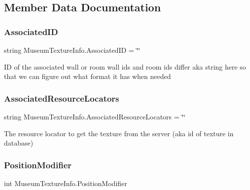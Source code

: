 \subsection{Member Data Documentation}
\mbox{\label{class_museum_texture_info_a31425831c498a46842b2cce06e629183}} 
\subsubsection{\texorpdfstring{Associated\+ID}{AssociatedID}}
{\footnotesize\ttfamily string Museum\+Texture\+Info.\+Associated\+ID = \char`\"{}\char`\"{}}



ID of the associated wall or room wall ids and room ids differ aka string here so that we can figure out what format it has when needed 

\mbox{\label{class_museum_texture_info_ae24092193557d3775c07762acb158adc}} 
\subsubsection{\texorpdfstring{Associated\+Resource\+Locators}{AssociatedResourceLocators}}
{\footnotesize\ttfamily string Museum\+Texture\+Info.\+Associated\+Resource\+Locators = \char`\"{}\char`\"{}}



The resource locator to get the texture from the server (aka id of texture in database) 

\mbox{\label{class_museum_texture_info_aaa15a48a616e6212ead2dd506f452974}} 
\subsubsection{\texorpdfstring{Position\+Modifier}{PositionModifier}}
{\footnotesize\ttfamily int Museum\+Texture\+Info.\+Position\+Modifier}



